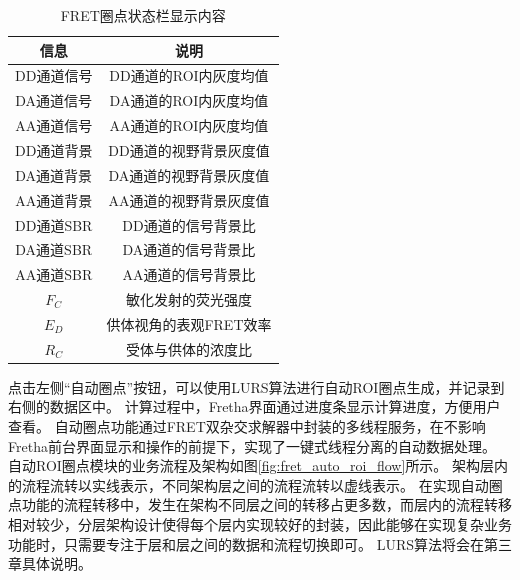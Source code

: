 \begin{table}[htbp]
  \centering
  \caption[FRET圈点状态栏显示内容]{FRET圈点状态栏显示内容}
  \label{tab:fret_statusbar_list}
      \begin{tabular}{cc}
      \toprule[1.5pt]
      {信息} & {说明} \\
      \midrule
      DD通道信号 & DD通道的ROI内灰度均值 \\
      DA通道信号 & DA通道的ROI内灰度均值 \\
      AA通道信号 & AA通道的ROI内灰度均值 \\
      DD通道背景 & DD通道的视野背景灰度值 \\
      DA通道背景 & DA通道的视野背景灰度值 \\
      AA通道背景 & AA通道的视野背景灰度值 \\
      DD通道SBR & DD通道的信号背景比 \\
      DA通道SBR & DA通道的信号背景比 \\
      AA通道SBR & AA通道的信号背景比 \\
      $F_C$ & 敏化发射的荧光强度 \\
      $E_D$ & 供体视角的表观FRET效率 \\
      $R_C$ & 受体与供体的浓度比 \\
      \bottomrule[1.5pt]
    \end{tabular}
\end{table}
点击左侧“自动圈点”按钮，可以使用LURS算法进行自动ROI圈点生成，并记录到右侧的数据区中。
计算过程中，Fretha界面通过进度条显示计算进度，方便用户查看。
自动圈点功能通过FRET双杂交求解器中封装的多线程服务，在不影响Fretha前台界面显示和操作的前提下，实现了一键式线程分离的自动数据处理。
自动ROI圈点模块的业务流程及架构如图\ref{fig:fret_auto_roi_flow}所示。
架构层内的流程流转以实线表示，不同架构层之间的流程流转以虚线表示。
在实现自动圈点功能的流程转移中，发生在架构不同层之间的转移占更多数，而层内的流程转移相对较少，分层架构设计使得每个层内实现较好的封装，因此能够在实现复杂业务功能时，只需要专注于层和层之间的数据和流程切换即可。
LURS算法将会在第三章具体说明。
